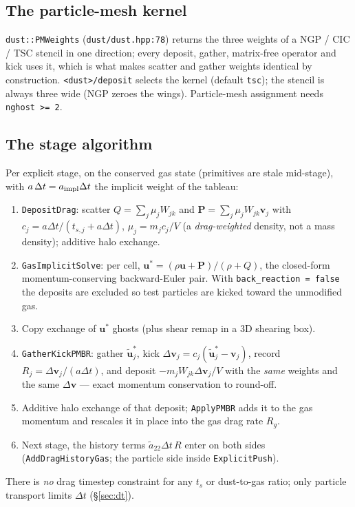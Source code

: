\documentclass[11pt]{article}
\newcommand{\code}[1]{\texttt{#1}}
\newcommand{\file}[1]{\texttt{\small #1}}
\newcommand{\fn}[1]{\texttt{\small #1}}
\begin{document}
\subsection{The particle-mesh kernel}

\fn{dust::PMWeights} (\file{dust/dust.hpp:78}) returns the three weights of a
NGP / CIC / TSC stencil in one direction; every deposit, gather, matrix-free
operator and kick uses it, which is what makes scatter and gather weights identical
by construction. \code{<dust>/deposit} selects the kernel (default \code{tsc}); the
stencil is always three wide (NGP zeroes the wings). Particle-mesh assignment needs
\code{nghost >= 2}.

\subsection{The stage algorithm}
\label{sec:stage}

Per explicit stage, on the conserved gas state (primitives are stale mid-stage),
with $a\,\Delta t = a_{\rm impl}\Delta t$ the implicit weight of the tableau:
\begin{enumerate}\itemsep2pt
  \item \fn{DepositDrag}: scatter $Q = \sum_j \mu_j W_{jk}$ and
        $\mathbf P = \sum_j \mu_j W_{jk}\mathbf v_j$ with $c_j = a\Delta t/(t_{s,j} + a\Delta t)$,
        $\mu_j = m_j c_j / V$ (a \emph{drag-weighted} density, not a mass density);
        additive halo exchange.
  \item \fn{GasImplicitSolve}: per cell, $\mathbf u^\ast = (\rho\mathbf u + \mathbf P)/(\rho + Q)$,
        the closed-form momentum-conserving backward-Euler pair. With
        \code{back\_reaction = false} the deposits are excluded so test particles are
        kicked toward the unmodified gas.
  \item Copy exchange of $\mathbf u^\ast$ ghosts (plus shear remap in a 3D shearing box).
  \item \fn{GatherKickPMBR}: gather $\tilde{\mathbf u}^\ast_j$, kick
        $\Delta\mathbf v_j = c_j(\tilde{\mathbf u}^\ast_j - \mathbf v_j)$, record
        $R_j = \Delta\mathbf v_j/(a\Delta t)$, and deposit
        $-m_j W_{jk}\Delta\mathbf v_j/V$ with the \emph{same} weights and the same
        $\Delta\mathbf v$ --- exact momentum conservation to round-off.
  \item Additive halo exchange of that deposit; \fn{ApplyPMBR} adds it to the gas
        momentum and rescales it in place into the gas drag rate $R_g$.
  \item Next stage, the history terms $\tilde a_{22}\Delta t\,R$ enter on both sides
        (\fn{AddDragHistoryGas}; the particle side inside \fn{ExplicitPush}).
\end{enumerate}
There is \emph{no} drag timestep constraint for any $t_s$ or dust-to-gas ratio; only
particle transport limits $\Delta t$ (\S\ref{sec:dt}).
\end{document}
